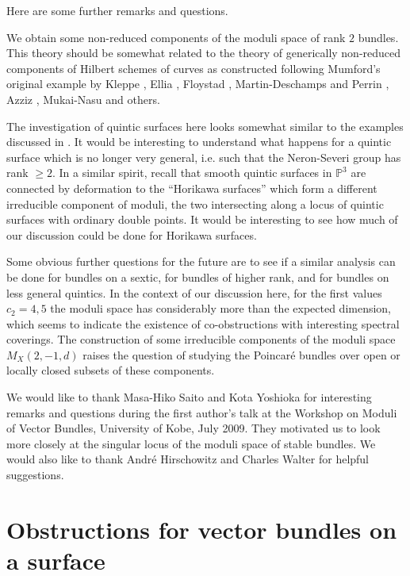 \documentclass{amsart}
\theoremstyle{plain}
\numberwithin{equation}{section}
\begin{document}
Here are some further remarks and questions. 

We obtain some non-reduced components of the moduli space of rank $2$ bundles.
This theory should be somewhat related to the theory of
generically non-reduced components of Hilbert schemes of
curves as constructed following Mumford's original example by 
Kleppe \cite{Kleppe}, Ellia \cite{Ellia}, 
Floystad \cite{Floystad},
Martin-Deschamps and Perrin \cite{MartinDeschampsPerrin}, Azziz \cite{Azziz}, Mukai-Nasu \cite{MukaiNasu} and others. 

The investigation of quintic surfaces here looks 
somewhat similar to the examples discussed in
\cite{ClemensKley}. It would be interesting to understand what happens for a quintic
surface which is no longer very general, i.e. such that the Neron-Severi group has
rank $\geq 2$. 
In a similar spirit, recall 
that smooth quintic surfaces in ${{\mathbb P}} ^3$ are connected by deformation to
the ``Horikawa surfaces'' which form a different irreducible component of moduli, the
two intersecting along a locus of quintic surfaces with ordinary double points.
It would be interesting to see how much of our discussion could be done for
Horikawa surfaces. 

Some obvious further questions for the future 
are to see if a similar analysis can be done for 
bundles on a sextic, for bundles of higher rank, and for bundles on less general
quintics. In the context of
our discussion here, for the first values
$c_2=4,5$ the moduli space has considerably more than the expected dimension, which 
seems to indicate the existence of co-obstructions with interesting 
spectral coverings. 
The construction of some irreducible components of the moduli space $M_X(2,-1,d)$
raises the question of studying the Poincar\'e bundles over open or locally
closed subsets of these
components. 

We would like to thank Masa-Hiko Saito and Kota Yoshioka for interesting remarks
and questions during the first author's talk at the Workshop on Moduli of Vector Bundles, University of Kobe, July 2009. They motivated us to look more closely at the singular locus of the moduli space of stable bundles. We would also like to thank Andr\'e Hirschowitz and Charles Walter for helpful suggestions. 

\section{Obstructions for vector bundles on a surface}
\end{document}
